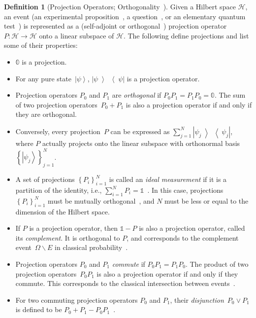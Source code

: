 \documentclass[12pt]{iopart}
\theoremstyle{plain}
\theoremstyle{definition}
\newtheorem{definition}[thm]{Definition}
\newcommand{\Hilb}{\mathcal{H}}
\newcommand{\ket}[1]{{\left\vert{#1}\right\rangle}}
\newcommand{\op}[2]{\ensuremath{\left\vert{#1}\middle\rangle\middle\langle{#2}\right\vert}}
\newcommand{\proj}[1]{\op{#1}{#1}}
\begin{document}
\begin{definition}[Projection Operators; Orthogonality~\cite{10.2307/2308516,Redhead1987-REDINA,peres1995quantum,Griffiths2003,Swart2013}]
  \label{def:Projection} Given a Hilbert space $\Hilb$, an event (an
  experimental proposition~\cite{BirkhoffVonNeumann1936}, a
  question~\cite{10.2307/2308516,Abramsky2012},
  or an elementary quantum test~\cite{peres1995quantum}) is represented
  as a (self-adjoint or orthogonal~\cite {Griffiths2003,Maassen2010})
  projection operator $P:\Hilb\rightarrow\Hilb$ onto a linear subspace
  of $\Hilb$. The following define projections and list some of their properties:
\begin{itemize}
\item $\mathbb{0}$ is a projection. 
\item For any pure state~$\ket{\psi}$, $\proj{\psi}$ is a projection
operator. 
\item Projection operators $P_{0}$ and $P_{1}$ are \emph{orthogonal}
  if $P_{0}P_{1}=P_{1}P_{0}=\mathbb{0}$. The sum of two projection
  operators~$P_{0}+P_{1}$ is also a projection operator if and only if
  they are orthogonal.
\item Conversely, every projection~$P$ can be expressed as
  $\sum_{j=1}^{N}\proj{\psi_{j}}$, where $P$ actually projects onto
  the linear subspace with orthonormal
  basis~$\left\{ \ket{\psi_{j}}\right\} _{j=1}^{N}$.
\item A set of projections $\left\{ P_{i}\right\} _{i=1}^{N}$ is
  called an \emph{ideal measurement} if it is a partition of the
  identity, i.e., $\sum_{i=1}^{N}P_{i}=\mathbb{1}$~\cite{Swart2013}.
  In this case, projections $\left\{ P_{i}\right\} _{i=1}^{N}$ must
  be mutually orthogonal~\cite{Griffiths2003,Halmos1957}, and $N$ must be less
  or equal to the dimension of the Hilbert space.
\item If $P$ is a projection operator, then $\mathbb{1}-P$ is also a
  projection operator, called its \emph{complement}. It is orthogonal to
  $P$, and corresponds to the complement event~$\Omega\backslash E$ in
  classical probability~\cite{Griffiths2003}.
\item Projection operators $P_{0}$ and $P_{1}$ \emph{commute} if $P_{0}P_{1}=P_{1}P_{0}$.
The product of two projection operators~$P_{0}P_{1}$ is also a projection
operator if and only if they commute. This corresponds to the classical
intersection between events~\cite{peres1995quantum,Griffiths2003}. 
\item For two commuting projection operators $P_{0}$ and $P_{1}$,
  their \emph{disjunction}~$P_{0}\vee P_{1}$ is defined to be
  $P_{0}+P_{1}-P_{0}P_{1}$~\cite{Griffiths2003}.
\end{itemize}
\end{definition}
\end{document}
